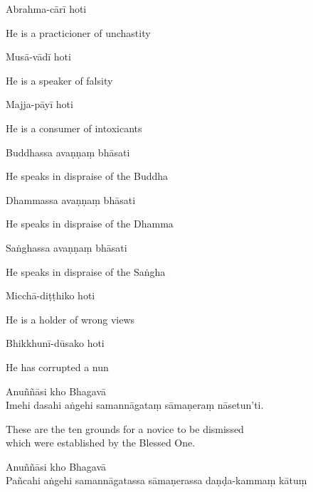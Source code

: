 Abrahma-cārī hoti

\begin{english}
  He is a practicioner of unchastity
\end{english}

Musā-vādī hoti

\begin{english}
  He is a speaker of falsity
\end{english}

Majja-pāyī hoti

\begin{english}
  He is a consumer of intoxicants
\end{english}

Buddhassa avaṇṇaṃ bhāsati

\begin{english}
  He speaks in dispraise of the Buddha
\end{english}

Dhammassa avaṇṇaṃ bhāsati

\begin{english}
  He speaks in dispraise of the Dhamma
\end{english}

Saṅghassa avaṇṇaṃ bhāsati

\begin{english}
  He speaks in dispraise of the Saṅgha
\end{english}

Micchā-diṭṭhiko hoti

\begin{english}
  He is a holder of wrong views
\end{english}

Bhikkhunī-dūsako hoti

\begin{english}
  He has corrupted a nun
\end{english}

Anuññāsi kho Bhagavā\\
Imehi dasahi aṅgehi samannāgataṃ sāmaṇeraṃ nāsetun'ti.

\begin{english}
  These are the ten grounds for a novice to be dismissed\\
  which were established by the Blessed One.
\end{english}


Anuññāsi kho Bhagavā\\
Pañcahi aṅgehi samannāgatassa sāmaṇerassa daṇḍa-kammaṃ kātuṃ

